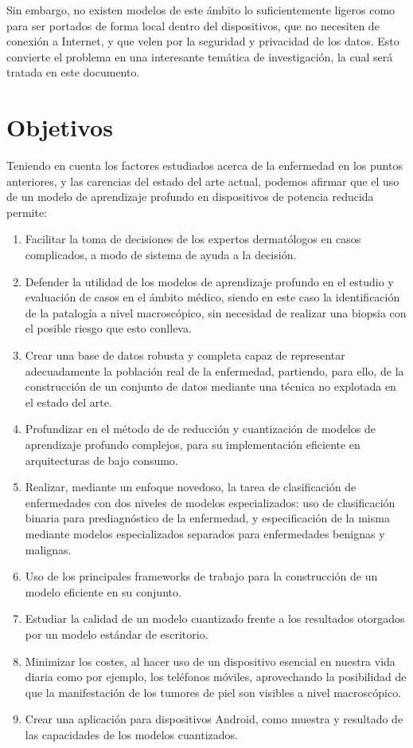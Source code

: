 Sin embargo, no existen modelos de este ámbito lo suficientemente ligeros como para ser portados de forma local dentro del dispositivos, que no necesiten de conexión a Internet, y que velen por la seguridad y privacidad de los datos. Esto convierte el problema en una interesante temática de investigación, la cual será tratada en este documento.

\section{Objetivos}

Teniendo en cuenta los factores estudiados acerca de la enfermedad en los puntos anteriores, y las carencias del estado del arte actual, podemos afirmar que el uso de un modelo de aprendizaje profundo en dispositivos de potencia reducida permite:
\begin{enumerate}
	\item Facilitar la toma de decisiones de los expertos dermatólogos en casos complicados, a modo de sistema de ayuda a la decisión.
	\item Defender la utilidad de los modelos de aprendizaje profundo en el estudio y evaluación de casos en el ámbito médico, siendo en este caso la identificación de la patalogía a nivel macroscópico, sin necesidad de realizar una biopsia con el posible riesgo que esto conlleva.
	\item Crear una base de datos robusta y completa capaz de representar adecuadamente la población real de la enfermedad, partiendo, para ello, de la construcción de un conjunto de datos mediante una técnica no explotada en el estado del arte.
	\item Profundizar en el método de de reducción y cuantización de modelos de aprendizaje profundo complejos, para su implementación eficiente en arquitecturas de bajo consumo.
	\item Realizar, mediante un enfoque novedoso, la tarea de clasificación de enfermedades con dos niveles de modelos especializados: uso de clasificación binaria para prediagnóstico de la enfermedad, y especificación de la misma mediante modelos especializados separados para enfermedades benignas y malignas.
	\item Uso de los principales frameworks de trabajo para la construcción de un modelo eficiente en su conjunto.
	\item Estudiar la calidad de un modelo cuantizado frente a los resultados otorgados por un modelo estándar de escritorio.
	\item Minimizar los costes, al hacer uso de un dispositivo esencial en nuestra vida diaria como por ejemplo, los teléfonos móviles, aprovechando la posibilidad de que la manifestación de los tumores de piel son visibles a nivel macroscópico.
	\item Crear una aplicación para dispositivos Android, como muestra y resultado de las capacidades de los modelos cuantizados.
\end{enumerate}

